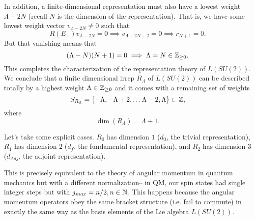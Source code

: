 In addition, a finite-dimensional representation must also have a lowest weight $\Lambda-2N$ (recall $N$ is the dimension of the representation). That is, we have some lowest weight vector $v_{\Lambda-2N}\neq 0$ such that
$$R(E_-)v_{\Lambda-2N}=0\implies v_{\Lambda-2N-2}=0 \implies r_{N+1}=0.$$
But that vanishing means that $$(\Lambda - N)(N+1)=0 \implies \Lambda= N \in \mathbb{Z}_{\geq 0}.$$
This completes the characterization of the representation theory of $L(SU(2))$. We conclude that a finite dimensional irrep $R_\Lambda$ of $L(SU(2))$ can be described totally by a highest weight $\Lambda \in \mathbb{Z}_{\geq 0}$ and it comes with a remaining set of weights
$$S_{R_\Lambda}=\{-\Lambda, -\Lambda+2,\ldots \Lambda-2,\Lambda\}\subset \mathbb{Z},$$
where $$\dim(R_\Lambda)=\Lambda+1.$$

\begin{exm}
Let's take some explicit cases. $R_0$ has dimension $1$ ($d_0$, the trivial representation), $R_1$ has dimension $2$ ($d_f$, the fundamental representation), and $R_2$ has dimension 3 ($d_{Adj}$, the adjoint representation).
\end{exm}

This is precisely equivalent to the theory of angular momentum in quantum mechanics but with a different normalization-- in QM, our spin states had single integer steps but with $j_{max}=n/2, n\in\mathbb{N}.$ This happens because the angular momentum operators obey the same bracket structure (i.e. fail to commute) in exactly the same way as the basis elements of the Lie algebra $L(SU(2))$. 